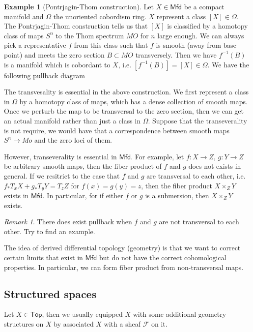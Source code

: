 \documentclass[11pt]{amsart}
\numberwithin{equation}{section}
\theoremstyle{definition}
\newtheorem{example}[thm]{Example}
\theoremstyle{remark}
\newtheorem{rem}[thm]{Remark}
\numberwithin{equation}{section}
\newcommand{\CF}{{\mathcal F}}
\newcommand{\mfd}{\mathsf{Mfd}}
\newcommand{\Top}{\mathsf{Top}}
\begin{document}
\begin{example}[Pontrjagin-Thom construction] 
	Let $X\in \mfd$ be a compact manifold and $\Omega$ the unoriented cobordism ring. $X$ represent a class $[X] \in \Omega$. The Pontrjagin-Thom construction tells us that $[X]$ is classified by a homotopy class of maps $S^n$ to the Thom spectrum $MO$ for $n$ large enough. We can always pick a representative $f$ from this class such that $f$ is smooth (away from base point) and meets the zero section $B\subset MO$ transversely. Then we have $f^{-1}(B)$ is a manifold which is cobordant to $X$, i.e. $[f^{-1}(B)]=[X] \in \Omega$. We have the following pullback diagram
		\begin{center}
	\end{center}
\end{example}
The transvesality is essential in the above construction. We first represent a class in $\Omega$ by a homotopy class of maps, which has a dense collection of smooth maps. Once we perturb the map to be transversal to the zero section, then we can get an actual manifold rather than just a class in $\Omega$. Suppose that the transeverality is not require, we would have that a correspondence between smooth maps $S^n\to Mo$ and the zero loci of them.

However, transeverality is essential in $\mfd$. For example, let $f:X\to Z$, $g:Y\to Z$ be arbitrary smooth maps, then the fiber product of $f$ and $g$ does not exists in general. If we resitrict to the case that $f$ and $g$ are transversal to each other, i.e. $f_{*}T_xX +g_{*}T_yY=T_zZ$ for $f(x)=g(y)=z$, then the fiber product $X\times_Z Y$ exists in $\mfd$. In particular, for if either $f$ or $g$ is a submersion, then $X\times_Z Y$ exists.
\begin{rem}
	There does exist pullback when $f$ and $g$ are not transversal to each other. Try to find an example.
\end{rem}

The idea of derived differential topology (geometry) is that we want to correct certain limits that exist in $\mfd$ but do not have the correct cohomological properties. In particular, we can form fiber product from non-transversal maps.

\subsection{Structured spaces}
Let $X\in \Top$, then we usually equipped $X$ with some additional geometry structures on $X$ by associated $X$ with a sheaf $\CF$ on it.
\end{document}
